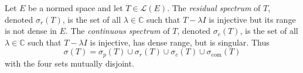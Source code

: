 Let $E$ be a normed space and let $T \in \mathcal{L}(E)$. The \textit{residual spectrum} of $T$, denoted $\sigma_r(T)$, is the set of all $\lambda \in \mathbb{C}$ such that $T - \lambda I$ is injective but its range is not dense in $E$. The \textit{continuous spectrum} of $T$, denoted $\sigma_c(T)$, is the set of all $\lambda \in \mathbb{C}$ such that $T - \lambda I$ is injective, has dense range, but is singular. Thus
$$\sigma(T) = \sigma_p(T) \cup \sigma_r(T) \cup \sigma_c(T) \cup \sigma_{\text{com}}(T)$$
with the four sets mutually disjoint.
